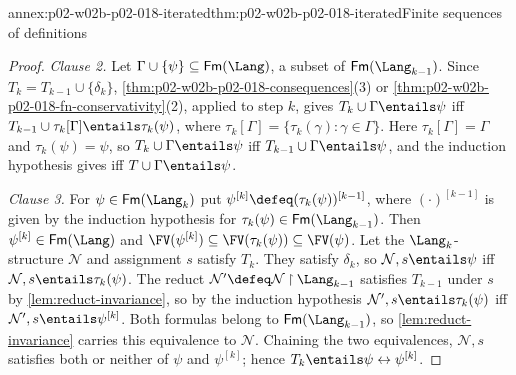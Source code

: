 \begin{annexitem}{annex:p02-w02b-p02-018-iterated}{thm:p02-w02b-p02-018-iterated}{Finite sequences of definitions}
\begin{proof}
\emph{Clause 2.}  Let \(\Gamma\cup\{\psi\}\subseteq\mathsf{Fm}(\Lang)\), a
subset of \(\mathsf{Fm}(\Lang_{k-1})\).  Since \(T_k=T_{k-1}\cup\{\delta_k\}\),
\cref{thm:p02-w02b-p02-018-consequences}(3) or
\cref{thm:p02-w02b-p02-018-fn-conservativity}(2), applied to step
\(k\), gives \(T_k\cup\Gamma\entails\psi\) iff
\(T_{k-1}\cup\tau_k[\Gamma]\entails\tau_k(\psi)\), where
\(\tau_k[\Gamma]=\{\tau_k(\gamma):\gamma\in\Gamma\}\).  Here
\(\tau_k[\Gamma]=\Gamma\) and \(\tau_k(\psi)=\psi\), so
\(T_k\cup\Gamma\entails\psi\) iff \(T_{k-1}\cup\Gamma\entails\psi\), and the
induction hypothesis gives iff \(T\cup\Gamma\entails\psi\).

\emph{Clause 3.}  For \(\psi\in\mathsf{Fm}(\Lang_k)\) put
\(\psi^{[k]}\defeq(\tau_k(\psi))^{[k-1]}\), where \((\cdot)^{[k-1]}\) is
given by the induction hypothesis for \(\tau_k(\psi)\in\mathsf{Fm}(\Lang_{k-1})\).
Then \(\psi^{[k]}\in\mathsf{Fm}(\Lang)\) and
\(\FV(\psi^{[k]})\subseteq\FV(\tau_k(\psi))\subseteq\FV(\psi)\).  Let the
\(\Lang_k\)-structure \(\mathcal N\) and assignment \(s\) satisfy \(T_k\).
They satisfy \(\delta_k\), so \(\mathcal N,s\entails\psi\) iff
\(\mathcal N,s\entails\tau_k(\psi)\).  The reduct
\(\mathcal N'\defeq\mathcal N\mathbin{\upharpoonright}\Lang_{k-1}\)
satisfies \(T_{k-1}\) under \(s\) by \cref{lem:reduct-invariance}, so by the
induction hypothesis \(\mathcal N',s\entails\tau_k(\psi)\) iff
\(\mathcal N',s\entails\psi^{[k]}\).  Both formulas belong to
\(\mathsf{Fm}(\Lang_{k-1})\), so \cref{lem:reduct-invariance} carries this
equivalence to \(\mathcal N\).  Chaining the two equivalences,
\(\mathcal N,s\) satisfies both or neither of \(\psi\) and \(\psi^{[k]}\);
hence \(T_k\entails\psi\leftrightarrow\psi^{[k]}\).
\end{proof}
\end{annexitem}
